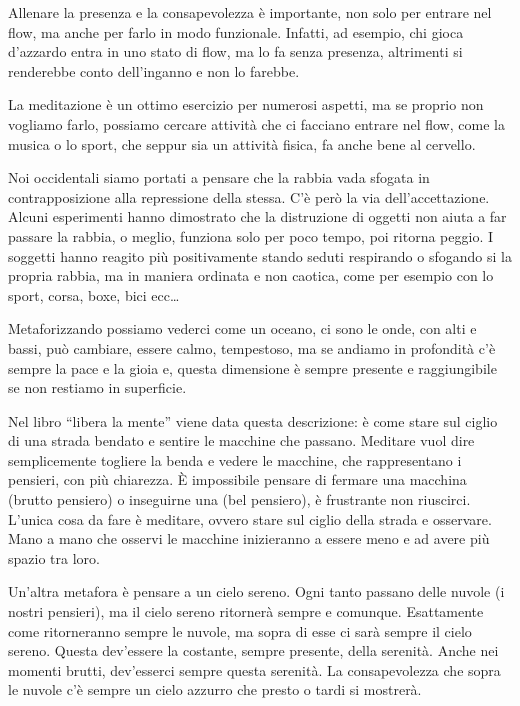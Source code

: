 \documentclass[12pt]{book} %
\begin{document}
\begin{mdframed}[linewidth=1pt]
Allenare la presenza e la consapevolezza è importante, non solo per entrare nel flow, ma anche per farlo in modo
funzionale. Infatti, ad esempio, chi gioca d'azzardo entra in uno stato di flow, ma lo fa senza
presenza, altrimenti si renderebbe conto dell'inganno e non lo farebbe.

La meditazione è un ottimo esercizio per numerosi aspetti, ma se proprio non vogliamo farlo, possiamo cercare attività
che ci facciano entrare nel flow, come la musica o lo sport, che seppur sia un attività fisica, fa anche bene al
cervello.
\end{mdframed}

Noi occidentali siamo portati a pensare che la rabbia vada sfogata in contrapposizione alla repressione della stessa.
C'è però la via dell'accettazione. Alcuni esperimenti hanno dimostrato che la
distruzione di oggetti non aiuta a far passare la rabbia, o meglio, funziona solo per poco tempo, poi ritorna peggio. I
soggetti hanno reagito più positivamente stando seduti respirando o sfogando si la propria rabbia, ma in maniera
ordinata e non caotica, come per esempio con lo sport, corsa, boxe, bici ecc… 

Metaforizzando possiamo vederci come un oceano, ci sono le onde, con alti e bassi, può cambiare, essere calmo,
tempestoso, ma se andiamo in profondità c'è sempre la pace e la gioia e, questa dimensione è sempre presente e
raggiungibile se non restiamo in superficie.

Nel libro “libera la mente” viene data questa descrizione: è come stare sul ciglio di una strada bendato e sentire le
macchine che passano. Meditare vuol dire semplicemente togliere la benda e vedere le macchine, che rappresentano i
pensieri, con più chiarezza. È impossibile pensare di fermare una macchina (brutto pensiero) o inseguirne una (bel
pensiero), è frustrante non riuscirci. L{}'unica cosa da fare è meditare, ovvero stare sul ciglio della strada e
osservare. Mano a mano che osservi le macchine inizieranno a essere meno e ad avere più spazio tra loro.

Un'altra metafora è pensare a un cielo sereno. Ogni tanto passano delle nuvole (i nostri pensieri),
ma il cielo sereno ritornerà sempre e comunque. Esattamente come ritorneranno sempre le nuvole, ma sopra di esse ci
sarà sempre il cielo sereno. Questa dev'essere la costante, sempre presente, della serenità. Anche nei momenti brutti,
dev'esserci sempre questa serenità. La consapevolezza che sopra le nuvole c'è sempre un cielo azzurro che presto o
tardi si mostrerà.
\end{document}
